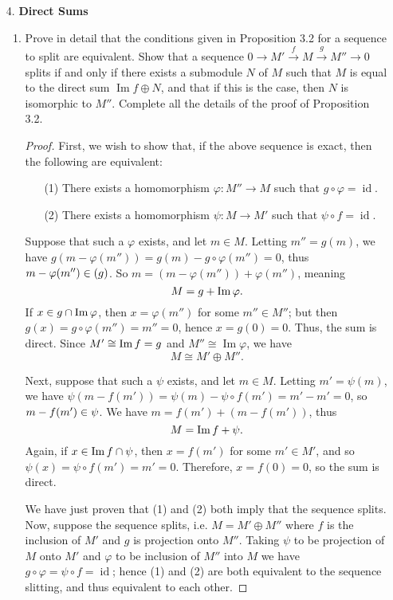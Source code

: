 \documentclass[10pt]{article}
\DeclareMathOperator*{\im}{Im}
\let\ker\relax
\DeclareMathOperator*{\ker}{Ker}
\DeclareMathOperator*{\id}{id}
\begin{document}
\begin{enumerate}
\item[4.] \textbf{Direct Sums}
\begin{enumerate}
\item Prove in detail that the conditions given in Proposition 3.2 for a sequence to split are equivalent.  Show that a sequence $0 \rightarrow M' \xrightarrow{f} M \xrightarrow{g} M'' \rightarrow 0
$ splits if and only if there exists a submodule $N$ of $M$ such that $M$ is equal to the direct sum $\im f \oplus N$, and that if this is the case, then $N$ is isomorphic to $M''$.  Complete all the details of the proof of Proposition 3.2.

\begin{proof}

First, we wish to show that, if the above sequence is exact, then the following are equivalent:
\begin{enumerate}
\item[(1)] There exists a homomorphism $\varphi : M'' \rightarrow M$ such that $g \circ \varphi = \id$.
\item[(2)] There exists a homomorphism $\psi : M \rightarrow M'$ such that $\psi \circ f = \id$.
\end{enumerate}

Suppose that such a $\varphi$ exists, and let $m \in M$.  Letting $m'' = g(m)$, we have $g(m - \varphi(m'')) = g(m) - g \circ \varphi(m'') = 0$, thus $m - \varphi(m'') \in \ker(g)$.  So $m = (m - \varphi(m'')) + \varphi(m'')$, meaning $$M = \ker g + \im \varphi.$$  If $x \in \ker g \cap \im \varphi$, then $x = \varphi(m'')$ for some $m'' \in M''$; but then $g(x) = g \circ \varphi(m'') = m'' = 0$, hence $x = g(0) = 0$.  Thus, the sum is direct.  Since $M' \cong \im f = \ker g$ and $M'' \cong \im \varphi$, we have $$M \cong M' \oplus M''.$$

Next, suppose that such a $\psi$ exists, and let $m \in M$.  Letting $m' = \psi(m)$, we have $\psi(m - f(m')) = \psi(m) - \psi \circ f(m') = m' - m' = 0$, so $m - f(m') \in \ker \psi$.  We have $m = f(m') + (m - f(m'))$, thus $$M = \im f + \ker \psi.$$  Again, if $x \in \im f \cap \ker \psi$, then $x = f(m')$ for some $m' \in M'$, and so $\psi(x) = \psi \circ f(m') = m' = 0$.  Therefore, $x = f(0) = 0$, so the sum is direct.

We have just proven that (1) and (2) both imply that the sequence splits.  Now, suppose the sequence splits, i.e. $M = M' \oplus M''$ where $f$ is the inclusion of $M'$ and $g$ is projection onto $M''$.  Taking $\psi$ to be projection of $M$ onto $M'$ and $\varphi$ to be inclusion of $M''$ into $M$ we have $g \circ \varphi = \psi \circ f = \id$; hence (1) and (2) are both equivalent to the sequence slitting, and thus equivalent to each other.


\end{proof}
\end{enumerate}
\end{enumerate}
\end{document}

